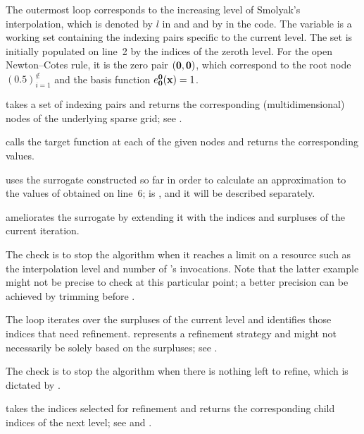 \begin{compactlist}

 The outermost loop corresponds to the increasing level of
Smolyak's interpolation, which is denoted by $l$ in  and
 and by  in the code. The 
variable is a working set containing the indexing pairs specific to the current
level. The set is initially populated on line~2 by the indices of the zeroth
level. For the open Newton--Cotes rule, it is the zero pair $(\mathbf{0}, \mathbf{0})$,
which correspond to the root node $(0.5)_{i = 1}^\nin$ and the basis function
$e^{\mathbf{0}}_{\mathbf{0}}(\mathbf{x}) = 1$.

  takes a set of indexing pairs and returns
the corresponding (multidimensional) nodes of the underlying sparse grid; see
.

  calls the target function at each of the given
nodes and returns the corresponding values.

  uses the surrogate constructed so far in order
to calculate an approximation to the values of  obtained on
line~6;  is , and it will be described
separately.

  ameliorates the surrogate by extending it with
the indices and surpluses of the current iteration.

 The check is to stop the algorithm when it reaches a limit on a
resource such as the interpolation level and number of 's
invocations. Note that the latter example might not be precise to check at this
particular point; a better precision can be achieved by trimming 
before .

 The loop iterates over the surpluses of the current level and
identifies those indices that need refinement. 
represents a refinement strategy and might not necessarily be solely based on
the surpluses; see .

 The check is to stop the algorithm when there is nothing left
to refine, which is dictated by .

  takes the indices selected for
refinement and returns the corresponding child indices of the next level; see
 and .

\end{compactlist}

